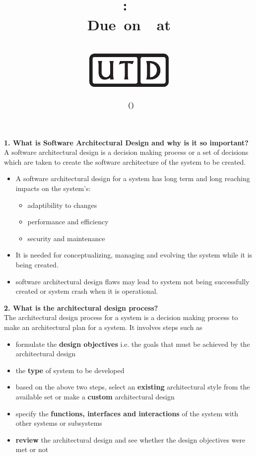 \documentclass[12pt,letterpaper,titlepage,en-US]{article}
\title{
    \vspace{1in}
    \textmd{\textbf{\hmwkClassName \\\hmwkClass:\ \hmwkTitle }}\\
    \normalsize\vspace{0.1in}\small{Due\ on\ \DTMusedate{DueDate}\ at \DTMusetime{DueDate} }\\
    \vspace{0.1in}\large{\textit{\hmwkClassInstructor}}\\
    \vspace{0.5in}\includegraphics[height=2.4em]{UTD_logo_BW}\\
    \vspace{2in}
}
\author{\textbf{\hmwkAuthorName\ \footnotesize{(\hmwkAuthorNetID)}} \\ }
\date{}
\begin{document}
\maketitle





\textbf{1. What is Software Architectural Design and why is it so important?}\\
A software architectural design is a decision making process or a set of decisions which are taken to create the software architecture of the system to be created.

\begin{itemize}[noitemsep,nolistsep]
\item A software architectural design for a system has long term and long reaching impacts on the system's:
\begin{itemize}[noitemsep,nolistsep]
\item adaptibility to changes
\item performance and efficiency
\item security and maintenance
\end{itemize}

\item It is needed for conceptualizing, managing and evolving the system while it is being created.

\item software architectural design flaws may lead to system not being successfully created or system crash when it is operational.\\
\end{itemize}

\textbf{2. What is the architectural design process?}\\
The architectural design process for a system  is a decision making process to make an architectural plan for a system. It involves steps such as
\begin{itemize}[noitemsep,nolistsep]
\item formulate the \textbf{design objectives} i.e. the goals that must be achieved by the architectural design
\item the \textbf{type} of system to be developed
\item based on the above two steps, select an \textbf{existing} architectural style from the available set or make a \textbf{custom} architectural design
\item specify the \textbf{functions,  interfaces and interactions} of the system with other systems or subsystems
\item \textbf{review} the architectural design and see whether the design objectives were met or not\\

\end{itemize}
\end{document}
